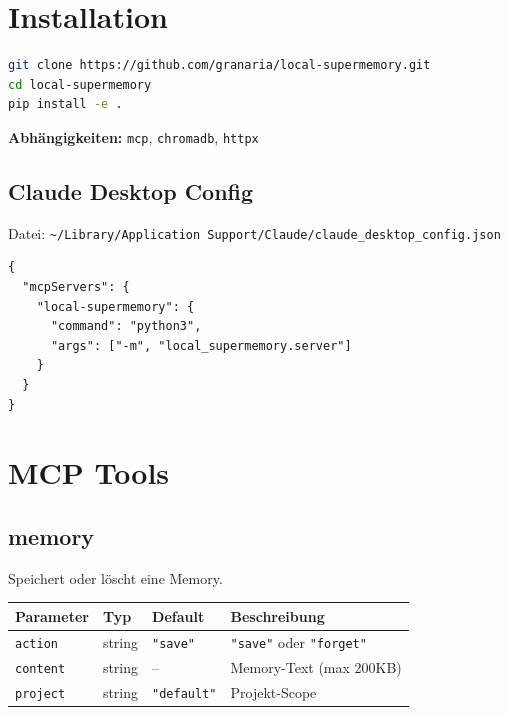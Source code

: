 \documentclass[11pt,a4paper]{article}
\begin{document}
\section{Installation}

\begin{lstlisting}[style=code,language=bash]
git clone https://github.com/granaria/local-supermemory.git
cd local-supermemory
pip install -e .
\end{lstlisting}

\textbf{Abhängigkeiten:} \texttt{mcp}, \texttt{chromadb}, \texttt{httpx}

\subsection{Claude Desktop Config}

Datei: \texttt{\textasciitilde/Library/Application Support/Claude/claude\_desktop\_config.json}

\begin{lstlisting}[style=code]
{
  "mcpServers": {
    "local-supermemory": {
      "command": "python3",
      "args": ["-m", "local_supermemory.server"]
    }
  }
}
\end{lstlisting}


\section{MCP Tools}

\subsection{memory}

Speichert oder löscht eine Memory.

\begin{tabular}{llll}
\toprule
\textbf{Parameter} & \textbf{Typ} & \textbf{Default} & \textbf{Beschreibung} \\
\midrule
\texttt{action} & string & \texttt{"save"} & \texttt{"save"} oder \texttt{"forget"} \\
\texttt{content} & string & -- & Memory-Text (max 200KB) \\
\texttt{project} & string & \texttt{"default"} & Projekt-Scope \\
\bottomrule
\end{tabular}
\end{document}
